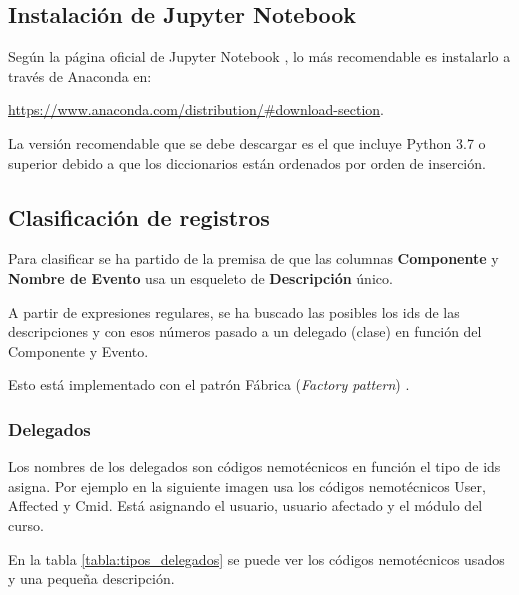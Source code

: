 \subsection{Instalación de Jupyter Notebook}

Según la página oficial de Jupyter Notebook \cite{noauthor_project_nodate}, lo más recomendable es instalarlo a través de Anaconda en:

\href{https://www.anaconda.com/distribution/\#download-section}{https://www.anaconda.com/distribution/\#download-section}.

La versión recomendable que se debe descargar es el que incluye Python 3.7 o superior debido a que los diccionarios están ordenados por orden de inserción.

\subsection{Clasificación de registros}

Para clasificar se ha partido de la premisa de que las columnas \textbf{Componente} y \textbf{Nombre de Evento} usa un esqueleto de \textbf{Descripción} único. 

A partir de expresiones regulares, se ha buscado las posibles los ids de las descripciones y con esos números pasado a un delegado (clase) en función del Componente y Evento. 



Esto está implementado con el patrón Fábrica (\textit{Factory pattern}) \cite{tutorialspoint.com_design_nodate}.


\subsubsection{Delegados}

Los nombres de los delegados son códigos nemotécnicos en función el tipo de ids asigna. Por ejemplo en la siguiente imagen usa los códigos nemotécnicos User, Affected y Cmid. Está asignando el usuario, usuario afectado y el módulo del curso.

En la tabla \ref{tabla:tipos_delegados} se puede ver los códigos nemotécnicos usados y una pequeña descripción.

